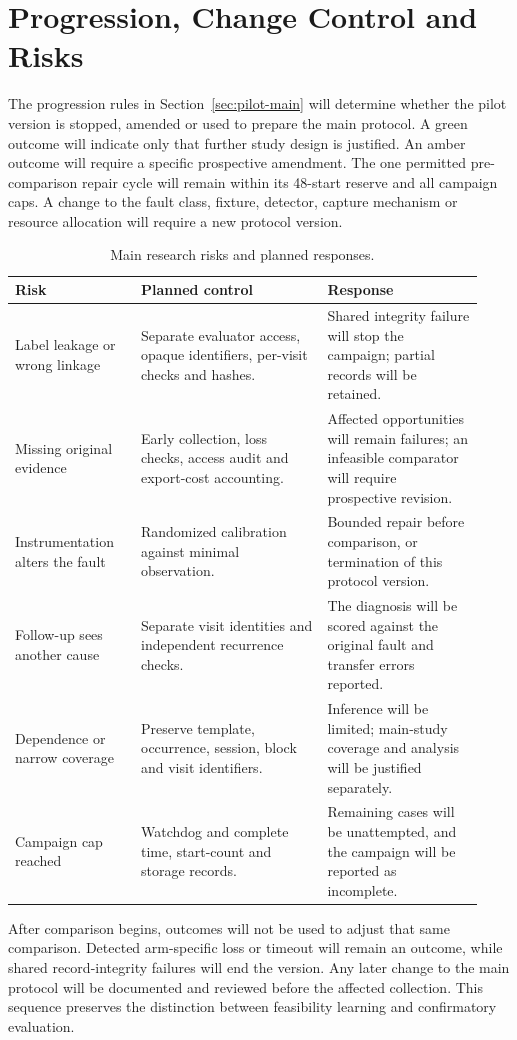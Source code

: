 \section{Progression, Change Control and Risks}

The progression rules in Section~\ref{sec:pilot-main} will determine whether the pilot version is stopped, amended or used to prepare the main protocol. A green outcome will indicate only that further study design is justified. An amber outcome will require a specific prospective amendment. The one permitted pre-comparison repair cycle will remain within its 48-start reserve and all campaign caps. A change to the fault class, fixture, detector, capture mechanism or resource allocation will require a new protocol version.

\begin{table}[htbp]
\centering
\setlength{\tabcolsep}{3pt}
\caption{Main research risks and planned responses.}
\label{tab:workplan-risks}
\begin{tabular}{p{0.25\linewidth}p{0.37\linewidth}p{0.31\linewidth}}
\toprule
Risk & Planned control & Response \\
\midrule
Label leakage or wrong linkage & Separate evaluator access, opaque identifiers, per-visit checks and hashes. & Shared integrity failure will stop the campaign; partial records will be retained. \\
Missing original evidence & Early collection, loss checks, access audit and export-cost accounting. & Affected opportunities will remain failures; an infeasible comparator will require prospective revision. \\
Instrumentation alters the fault & Randomized calibration against minimal observation. & Bounded repair before comparison, or termination of this protocol version. \\
Follow-up sees another cause & Separate visit identities and independent recurrence checks. & The diagnosis will be scored against the original fault and transfer errors reported. \\
Dependence or narrow coverage & Preserve template, occurrence, session, block and visit identifiers. & Inference will be limited; main-study coverage and analysis will be justified separately. \\
Campaign cap reached & Watchdog and complete time, start-count and storage records. & Remaining cases will be unattempted, and the campaign will be reported as incomplete. \\
\bottomrule
\end{tabular}
\end{table}

After comparison begins, outcomes will not be used to adjust that same comparison. Detected arm-specific loss or timeout will remain an outcome, while shared record-integrity failures will end the version. Any later change to the main protocol will be documented and reviewed before the affected collection. This sequence preserves the distinction between feasibility learning and confirmatory evaluation.
